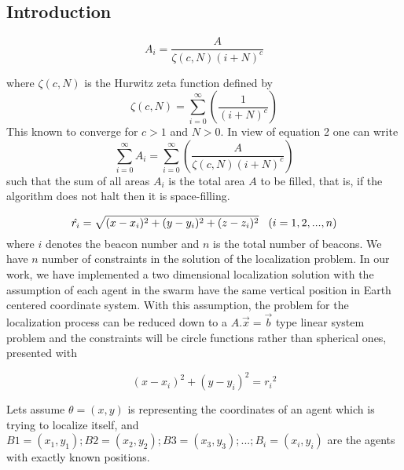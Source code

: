 \documentclass[twoside]{article}
\begin{document}
	\begin{multicols}{2} %
		
		\section{Introduction}
	
	\begin{equation} %
	A_i = {\frac{A}{{\zeta(c,N)(i+N)^c}}}
	\end{equation}	
	
	where ${\zeta(c,N)}$ is the Hurwitz zeta function defined by 
	\begin{equation}
 \zeta(c,N) = \sum_{i=0}^{\infty}\left(\frac{1}{(i+N)^c}\right)
	\end{equation}
	This known to converge for $c>1$ and $N>0$. In view of equation 2 one can write
	\begin{equation}
    \sum_{i=0}^{\infty}A_i = \sum_{i = 0}^{\infty}\left(\frac{A}{\zeta(c,N)(i+N)^c}\right)
	\end{equation}
such that the sum of all areas $A_i$ is the total area $A$ to be filled, that is, if the algorithm does not halt then it is space-filling. 
		



\begin{equation} %
\hat{r_i} = \sqrt{(x-x_i)^2 + (y-y_i)^2+ (z-z_i)^2}    \hspace{0.3cm}   (i=1,2,...,n)
\end{equation}
where $i$ denotes the beacon number and $n$ is the total number of beacons. We have $n$ number of constraints in the solution of the localization problem. In our work, we have implemented a two dimensional localization solution with the assumption of each agent in the swarm have the same vertical position in Earth centered coordinate system. With this assumption, the problem for the localization process can be reduced down to a $A.\vec{x} =\vec{b} $ type linear system problem and the constraints will be circle functions rather than spherical ones, presented with

\begin{equation}
  (x-x_i)^2 + (y - y_i)^2 = {r_i}^2
\end{equation}

Lets assume $\theta = (x,y)$ is representing the coordinates of an agent which is trying to localize itself, and $B1 = (x_1,y_1) ; B2 = (x_2,y_2) ; B3 = (x_3,y_3) ; ...  ; B_i = (x_i,y_i)$ are the agents with exactly known positions. 



\end{multicols}
\end{document}
